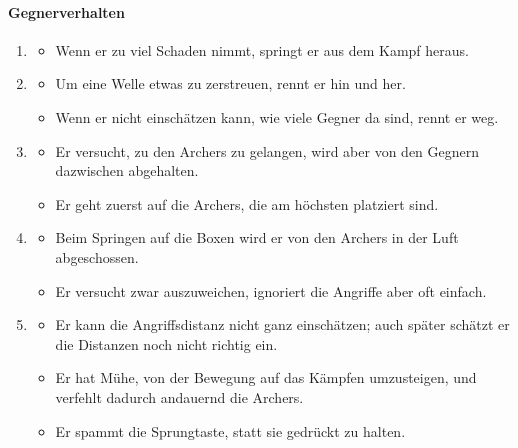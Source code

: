 \documentclass[../Main.tex]{subfiles}
\begin{document}
\paragraph{Gegnerverhalten}
\begin{enumerate}[label=\textbf{B\arabic*}, leftmargin=1.5cm, itemsep=0.8em]
    \item
        \begin{itemize}[nosep]
            \item Wenn er zu viel Schaden nimmt, springt er aus dem Kampf heraus.
        \end{itemize}
    \item
        \begin{itemize}[nosep]
            \item Um eine Welle etwas zu zerstreuen, rennt er hin und her.
            \item Wenn er nicht einschätzen kann, wie viele Gegner da sind, rennt er weg.
        \end{itemize}
    \item
        \begin{itemize}[nosep]
            \item Er versucht, zu den Archers zu gelangen, wird aber von den Gegnern dazwischen abgehalten.
            \item Er geht zuerst auf die Archers, die am höchsten platziert sind.
        \end{itemize}
    \item
        \begin{itemize}[nosep]
            \item Beim Springen auf die Boxen wird er von den Archers in der Luft abgeschossen.
            \item Er versucht zwar auszuweichen, ignoriert die Angriffe aber oft einfach.
        \end{itemize}
    \item
        \begin{itemize}[nosep]
            \item Er kann die Angriffsdistanz nicht ganz einschätzen; auch später schätzt er die Distanzen noch nicht richtig ein.
            \item Er hat Mühe, von der Bewegung auf das Kämpfen umzusteigen, und verfehlt dadurch andauernd die Archers.
            \item Er spammt die Sprungtaste, statt sie gedrückt zu halten.
        \end{itemize}
\end{enumerate}
\end{document}
